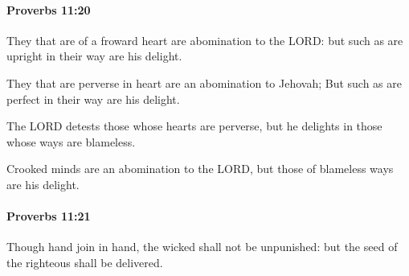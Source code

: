 		\paragraph{Proverbs 11:20} %
			\label{PROVERBS-11-20}

			They that are of a froward heart are abomination to the LORD: but such as are upright in their way are his delight.

			\begin{versebox}
					\item[BHS] 
					\item[ASV] They that are perverse in heart are an abomination to Jehovah; But such as are perfect in their way are his delight.
					\item[NIV] The LORD detests those whose hearts are perverse, but he delights in those whose ways are blameless.
					\item[NRSV] Crooked minds are an abomination to the LORD, but those of blameless ways are his delight.
			\end{versebox}

		\paragraph{Proverbs 11:21} %
			\label{PROVERBS-11-21}

			Though hand join in hand, the wicked shall not be unpunished: but the seed of the righteous shall be delivered.

